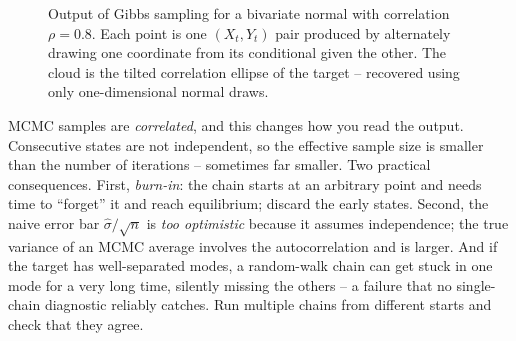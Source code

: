 \begin{figure}[H]
\centering
{}
\caption{Output of Gibbs sampling for a bivariate normal with correlation
$\rho=0.8$. Each point is one $(X_t,Y_t)$ pair produced by alternately drawing one
coordinate from its conditional given the other. The cloud is the tilted
correlation ellipse of the target -- recovered using only one-dimensional normal
draws.}
\label{ch35:fig-gibbs-cloud}
\end{figure}

\begin{trapbox}
MCMC samples are \emph{correlated}, and this changes how you read the output.
Consecutive states are not independent, so the effective sample size is smaller
than the number of iterations -- sometimes far smaller. Two practical
consequences. First, \emph{burn-in}: the chain starts at an arbitrary point and
needs time to ``forget'' it and reach equilibrium; discard the early states.
Second, the naive error bar $\hat\sigma/\sqrt n$ is \emph{too optimistic} because
it assumes independence; the true variance of an MCMC average involves the
autocorrelation and is larger. And if the target has well-separated modes, a
random-walk chain can get stuck in one mode for a very long time, silently
missing the others -- a failure that no single-chain diagnostic reliably catches.
Run multiple chains from different starts and check that they agree.
\end{trapbox}

